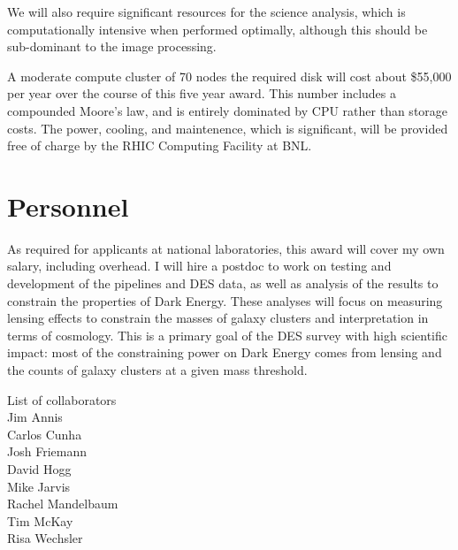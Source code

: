 \documentclass[12pt]{article}
\begin{document}
We will also require significant resources for the science analysis, which is
computationally intensive when performed optimally, although this should be
sub-dominant to the image processing.

A moderate compute cluster of 70 nodes the required disk will cost about
\$55,000 per year over the course of this five year award.  This number
includes a compounded Moore's law, and is entirely dominated by CPU rather than
storage costs.  The power, cooling, and maintenence, which is significant, will
be provided free of charge by the RHIC Computing Facility at BNL.

\section{Personnel}

As required for applicants at national laboratories, this award will cover my
own salary, including overhead.  I will hire a postdoc to work on testing and
development of the pipelines and DES data, as well as analysis of the results
to constrain the properties of Dark Energy.  These analyses will focus on
measuring lensing effects to constrain the masses of galaxy clusters and
interpretation in terms of cosmology.  This is a primary goal of the DES survey
with high scientific impact:  most of the constraining power on Dark Energy
comes from lensing and the counts of galaxy clusters at a given mass threshold.  

\newpage

\noindent
List of collaborators\\

\noindent
Jim Annis\\
Carlos Cunha\\
Josh Friemann\\
David Hogg\\
Mike Jarvis\\
Rachel Mandelbaum\\
Tim McKay\\
Risa Wechsler
\end{document}
